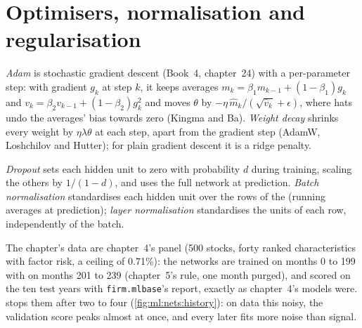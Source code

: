 \section{Optimisers, normalisation and regularisation}

\begin{definition}\label{def:ml:neural-networks-for-noisy-tabular-data:adam}
\emph{Adam} is stochastic gradient descent (Book~4, chapter~24) with a per-parameter step: with gradient
$g_k$ at step $k$, it keeps averages $m_k = \beta_1m_{k-1} + (1-\beta_1)g_k$ and $v_k = \beta_2v_{k-1} + (1-\beta_2)g_k^2$
and moves $\theta$ by $-\eta\,\hat m_k/(\sqrt{\hat v_k} + \epsilon)$, where hats undo the averages' bias towards zero
(Kingma and Ba). \emph{Weight decay} shrinks every weight by $\eta\lambda\theta$ at each step, apart
from the gradient step (AdamW, Loshchilov and Hutter); for plain gradient descent it is a ridge penalty.
\end{definition}

\begin{definition}\label{def:ml:neural-networks-for-noisy-tabular-data:dropout}
\emph{Dropout} sets each hidden unit to zero with probability $d$ during training, scaling the others by
$1/(1 - d)$, and uses the full network at prediction. \emph{Batch normalisation} standardises
each hidden unit over the rows of the  (running averages at prediction); \emph{layer
normalisation} standardises the units of each row, independently of the batch.
\end{definition}

The chapter's data are chapter~4's panel (500 stocks, forty ranked characteristics with factor risk, a ceiling of
0.71\%): the networks are trained on months 0 to 199 with  on months 201 to 239 (chapter~5's rule, one
month purged), and scored on the ten test years with \texttt{firm.mlbase}'s report, exactly as chapter~4's models were.
 stops them after two to four  (\cref{fig:ml:nets:history}): on data this noisy, the validation
score peaks almost at once, and every later  fits more noise than signal.

